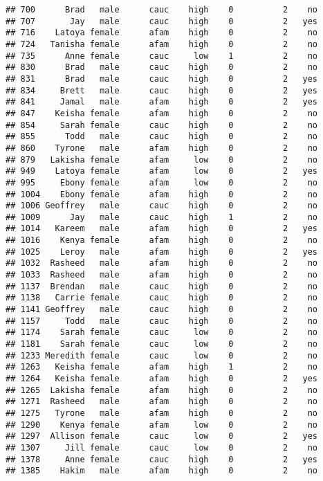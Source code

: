 \documentclass[
]{article}
\begin{document}
\begin{verbatim}
## 700      Brad   male      cauc    high    0          2    no
## 707       Jay   male      cauc    high    0          2   yes
## 716    Latoya female      afam    high    0          2    no
## 724   Tanisha female      afam    high    0          2    no
## 735      Anne female      cauc     low    1          2    no
## 830      Brad   male      cauc    high    0          2    no
## 831      Brad   male      cauc    high    0          2   yes
## 834     Brett   male      cauc    high    0          2   yes
## 841     Jamal   male      afam    high    0          2   yes
## 847    Keisha female      afam    high    0          2    no
## 854     Sarah female      cauc    high    0          2    no
## 855      Todd   male      cauc    high    0          2    no
## 860    Tyrone   male      afam    high    0          2    no
## 879   Lakisha female      afam     low    0          2    no
## 949    Latoya female      afam     low    0          2   yes
## 995     Ebony female      afam     low    0          2    no
## 1004    Ebony female      afam    high    0          2    no
## 1006 Geoffrey   male      cauc    high    0          2    no
## 1009      Jay   male      cauc    high    1          2    no
## 1014   Kareem   male      afam    high    0          2   yes
## 1016    Kenya female      afam    high    0          2    no
## 1025    Leroy   male      afam    high    0          2   yes
## 1032  Rasheed   male      afam    high    0          2    no
## 1033  Rasheed   male      afam    high    0          2    no
## 1137  Brendan   male      cauc    high    0          2    no
## 1138   Carrie female      cauc    high    0          2    no
## 1141 Geoffrey   male      cauc    high    0          2    no
## 1157     Todd   male      cauc    high    0          2    no
## 1174    Sarah female      cauc     low    0          2    no
## 1181    Sarah female      cauc     low    0          2    no
## 1233 Meredith female      cauc     low    0          2    no
## 1263   Keisha female      afam    high    1          2    no
## 1264   Keisha female      afam    high    0          2   yes
## 1265  Lakisha female      afam    high    0          2    no
## 1271  Rasheed   male      afam    high    0          2    no
## 1275   Tyrone   male      afam    high    0          2    no
## 1290    Kenya female      afam     low    0          2    no
## 1297  Allison female      cauc     low    0          2   yes
## 1307     Jill female      cauc     low    0          2    no
## 1378     Anne female      cauc    high    0          2   yes
## 1385    Hakim   male      afam    high    0          2    no

\end{verbatim}
\end{document}
